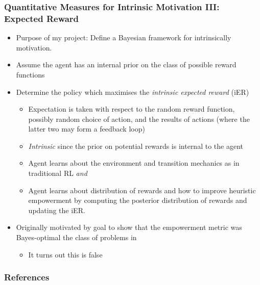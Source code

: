 \documentclass[aspectratio=169]{beamer}
\begin{document}
\begin{frame}
	\frametitle{Quantitative Measures for Intrinsic Motivation III: Expected Reward}
	\begin{itemize}
		\item Purpose of my project: Define a Bayesian framework for intrinsically motivation.
		\item Assume the agent has an internal prior on the class of possible reward functions\pause
		\item Determine the policy which maximises the \textit{intrinsic expected reward} (iER)
		\begin{itemize}
			\item Expectation is taken with respect to the random reward function, possibly random choice of action, and the results of actions (where the latter two may form a feedback loop)\pause
			\item \textit{Intrinsic} since the prior on potential rewards is internal to the agent\pause\vspace{0.5em}
			\item Agent learns about the environment and transition mechanics as in traditional RL \textit{and} 
			\item Agent learns about distribution of rewards and how to improve heuristic empowerment by computing the posterior distribution of rewards and updating the iER.\pause			
		\end{itemize}		 
		\item Originally motivated by goal to show that the empowerment metric was Bayes-optimal the class of problems in \citet{mohamed2015variational}
		\begin{itemize}
			\item It turns out this is false
		\end{itemize}
	\end{itemize}
\end{frame}

\begin{frame}[allowframebreaks]
\frametitle{References}
\nocite{*}

\end{frame}
\end{document}
